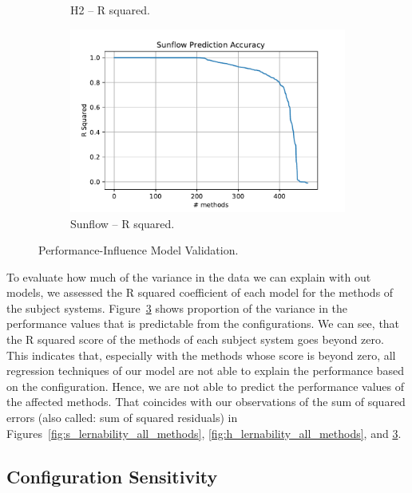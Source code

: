 \begin{figure}[h]
\begin{subfigure}{.5\textwidth}
	  \caption{H2 -- R squared.}
	  \label{fig:catena_model_r_sq}
	\end{subfigure}
	\begin{subfigure}{.5\textwidth}
	  \centering
	  \includegraphics[width=.99\linewidth]{images/Sunflow_plt_learnable_func_all_model_r_sq}
	  \caption{Sunflow -- R squared.}
	  \label{fig:catena_model_r_sq}
	\end{subfigure}
	\caption{Performance-Influence Model Validation.}
	\label{fig:c_lernability_all_methods}
\end{figure}

To evaluate how much of the variance in the data we can explain with out models, we assessed the R squared coefficient of each model for the methods of the subject systems. Figure~\ref{fig:c_lernability_all_methods} shows proportion of the variance in the performance values that is predictable from the configurations. We can see, that the R squared score of the methods of each subject system goes beyond zero. This indicates that, especially with the methods whose score is beyond zero, all regression techniques of our model are not able to explain the performance based on the configuration. Hence, we are not able to predict the performance values of the affected methods. That coincides with our observations of the sum of squared errors (also called: sum of squared residuals) in Figures~\ref{fig:s_lernability_all_methods}, \ref{fig:h_lernability_all_methods}, and \ref{fig:c_lernability_all_methods}.



\subsection{Configuration Sensitivity}
\label{conf_sens}

